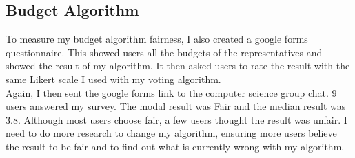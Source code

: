 \subsection{Budget Algorithm}
To measure my budget algorithm fairness, I also created a google forms questionnaire. This showed users all the budgets of the representatives and showed the result of my algorithm. It then asked users to rate the result with the same Likert scale I used with my voting algorithm.  \\
Again, I then sent the google forms link to the computer science group chat. 9 users answered my survey. The modal result was Fair and the median result was 3.8. Although most users choose fair, a few users thought the result was unfair. I need to do more research to change my algorithm, ensuring more users believe the result to be fair and to find out what is currently wrong with my algorithm.

